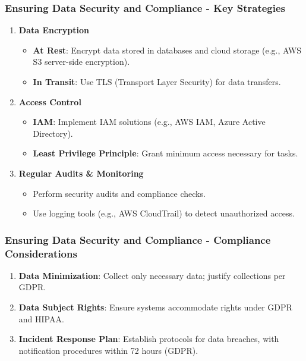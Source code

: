 \documentclass{beamer}
\begin{document}
\begin{frame}[fragile]
    \frametitle{Ensuring Data Security and Compliance - Key Strategies}
    \begin{enumerate}
        \item \textbf{Data Encryption}
            \begin{itemize}
                \item \textbf{At Rest}: Encrypt data stored in databases and cloud storage (e.g., AWS S3 server-side encryption).
                \item \textbf{In Transit}: Use TLS (Transport Layer Security) for data transfers.
            \end{itemize}
        
        \item \textbf{Access Control}
            \begin{itemize}
                \item \textbf{IAM}: Implement IAM solutions (e.g., AWS IAM, Azure Active Directory).
                \item \textbf{Least Privilege Principle}: Grant minimum access necessary for tasks.
            \end{itemize}
        
        \item \textbf{Regular Audits \& Monitoring}
            \begin{itemize}
                \item Perform security audits and compliance checks.
                \item Use logging tools (e.g., AWS CloudTrail) to detect unauthorized access.
            \end{itemize}
    \end{enumerate}
\end{frame}

\begin{frame}[fragile]
    \frametitle{Ensuring Data Security and Compliance - Compliance Considerations}
    \begin{enumerate}
        \item \textbf{Data Minimization}: Collect only necessary data; justify collections per GDPR.
        \item \textbf{Data Subject Rights}: Ensure systems accommodate rights under GDPR and HIPAA.
        \item \textbf{Incident Response Plan}: Establish protocols for data breaches, with notification procedures within 72 hours (GDPR).
    \end{enumerate}
\end{frame}
\end{document}
